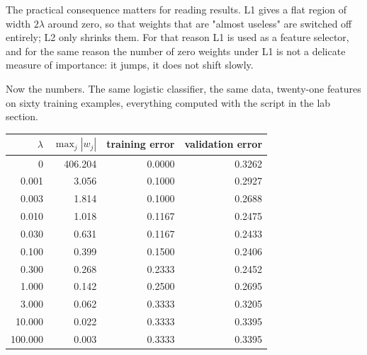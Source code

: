 The practical consequence matters for reading results. L1 gives a flat region of
width $2\lambda$ around zero, so that weights that are "almost useless" are switched
off entirely; L2 only shrinks them. For that reason L1 is used as a feature
selector, and for the same reason the number of zero weights under L1 is not a
delicate measure of importance: it jumps, it does not shift slowly.

Now the numbers. The same logistic classifier, the same data, twenty-one features
on sixty training examples, everything computed with the script in the lab section.

\begin{center}
\small
\begin{tabular}{rrrr}
\hline
$\lambda$ & $\max_j|w_j|$ & training error & validation error \\
\hline
0       & 406.204 & 0.0000 & 0.3262 \\
0.001   &   3.056 & 0.1000 & 0.2927 \\
0.003   &   1.814 & 0.1000 & 0.2688 \\
0.010   &   1.018 & 0.1167 & 0.2475 \\
0.030   &   0.631 & 0.1167 & 0.2433 \\
0.100   &   0.399 & 0.1500 & 0.2406 \\
0.300   &   0.268 & 0.2333 & 0.2452 \\
1.000   &   0.142 & 0.2500 & 0.2695 \\
3.000   &   0.062 & 0.3333 & 0.3205 \\
10.000  &   0.022 & 0.3333 & 0.3395 \\
100.000 &   0.003 & 0.3333 & 0.3395 \\
\hline
\end{tabular}
\end{center}

